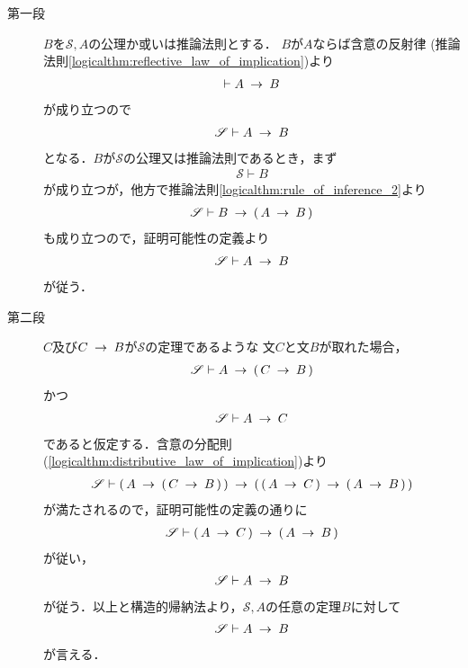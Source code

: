 	\begin{metaprf}\mbox{}
		\begin{description}
			\item[第一段]
				$B$を$\mathscr{S},A$の公理か或いは推論法則とする．
				$B$が$A$ならば含意の反射律
				(推論法則\ref{logicalthm:reflective_law_of_implication})より
				\begin{align}
					\vdash A \hspace{0.25em}\rightarrow\hspace{0.25em} B
				\end{align}
				が成り立つので
				\begin{align}
					\mathscr{S} \vdash A \hspace{0.25em}\rightarrow\hspace{0.25em} B
				\end{align}
				となる．$B$が$\mathscr{S}$の公理又は推論法則であるとき，まず
				\begin{align}
					\mathscr{S} \vdash B
				\end{align}
				が成り立つが，他方で推論法則\ref{logicalthm:rule_of_inference_2}より
				\begin{align}
					\mathscr{S} \vdash B \hspace{0.25em}\rightarrow\hspace{0.25em} (\, A \hspace{0.25em}\rightarrow\hspace{0.25em} B\, ) 
				\end{align}
				も成り立つので，証明可能性の定義より
				\begin{align}
					\mathscr{S} \vdash A \hspace{0.25em}\rightarrow\hspace{0.25em} B
				\end{align}
				が従う．
				
			\item[第二段]
				$C$及び$C \hspace{0.25em}\rightarrow\hspace{0.25em} B$が$\mathscr{S}$の定理であるような
				文$C$と文$B$が取れた場合，
				\begin{align}
					\mathscr{S} \vdash A \hspace{0.25em}\rightarrow\hspace{0.25em} (\, C \hspace{0.25em}\rightarrow\hspace{0.25em} B\, )
				\end{align}
				かつ
				\begin{align}
					\mathscr{S} \vdash A \hspace{0.25em}\rightarrow\hspace{0.25em} C
				\end{align}
				であると仮定する．含意の分配則
				(\ref{logicalthm:distributive_law_of_implication})より
				\begin{align}
					\mathscr{S} \vdash 
					(\, A \hspace{0.25em}\rightarrow\hspace{0.25em} (\, C \hspace{0.25em}\rightarrow\hspace{0.25em} B\, )\, ) 
					\hspace{0.25em}\rightarrow\hspace{0.25em} (\, (\, A \hspace{0.25em}\rightarrow\hspace{0.25em} C\, ) \hspace{0.25em}\rightarrow\hspace{0.25em} (\, A \hspace{0.25em}\rightarrow\hspace{0.25em} B\, )\, )
				\end{align}
				が満たされるので，証明可能性の定義の通りに
				\begin{align}
					\mathscr{S} \vdash (\, A \hspace{0.25em}\rightarrow\hspace{0.25em} C\, ) 
					\hspace{0.25em}\rightarrow\hspace{0.25em} (\, A \hspace{0.25em}\rightarrow\hspace{0.25em} B\, )
				\end{align}
				が従い，
				\begin{align}
					\mathscr{S} \vdash A \hspace{0.25em}\rightarrow\hspace{0.25em} B
				\end{align}
				が従う．以上と構造的帰納法より，$\mathscr{S},A$の任意の定理$B$に対して
				\begin{align}
					\mathscr{S} \vdash A \hspace{0.25em}\rightarrow\hspace{0.25em} B
				\end{align}
				が言える．
				\QED
		\end{description}
	\end{metaprf}
	
